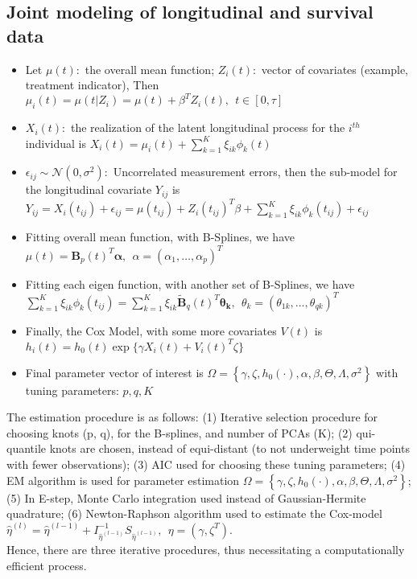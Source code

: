 \documentclass[11pt]{extarticle} %
\begin{document}
\subsection*{Joint modeling of longitudinal and survival data}
\begin{itemize}
\item Let $\mu(t):$ the overall mean function; $Z_i(t):$ vector of covariates (example, treatment indicator), Then 
$ \mu_i(t) = \mu(t|Z_i) = \mu(t) + \beta^T Z_i(t), \ \ t \in [0, \tau] $
\item $X_i(t):$ the realization of the latent longitudinal process for the $i^{th}$ individual is 
$ X_i (t) = \mu_i (t) + \sum_{k=1}^{K} \xi_{ik} \phi_k (t) $
\item $\epsilon _{ij} \sim  \mathcal{N}(0, \sigma^2): $ Uncorrelated measurement errors, then the sub-model for the longitudinal covariate $Y_{ij}$ is  
$ Y_{ij} =  X_i(t_{ij}) + \epsilon _{ij} = \mu(t_{ij}) + Z_i(t_{ij})^T\beta + \sum_{k=1}^{K} \xi_{ik} \phi_k (t_{ij})+ \epsilon_{ij}$
\item Fitting overall mean function, with B-Splines, we have 
$ \mu(t) =  \mathbf{B}_p(t)^T \mathbf{\alpha},\ \ \alpha = (\alpha_1, \dots, \alpha_p)^T $
\item Fitting each eigen function, with another set of B-Splines, we have
$ \sum_{k=1}^{K} \xi_{ik} \phi_k (t_{ij}) =  \sum_{k=1}^{K} \xi_{ik} \widetilde{\mathbf{B}}_q(t)^T \mathbf{\theta _k},\ \ \theta_{k} = (\theta_{1k}, \dots, \theta_{qk})^T $
\item Finally, the Cox Model, with some more covariates $V(t)$ is 
$ h_i(t) = h_0(t)\exp\{\gamma X_i(t) + V_i(t)^T \zeta \}$
\item Final parameter vector of interest is 
$ \Omega = \left\{ \gamma, \zeta, h_0(\cdot), \alpha, \beta, \Theta, \Lambda, \sigma^2 \right\} $
with tuning parameters: $p, q, K$
\end{itemize}
The estimation procedure is as follows: (1) Iterative selection procedure for choosing knots (p, q), for the B-splines, and number of PCAs (K); (2) qui-quantile knots are chosen, instead of equi-distant (to not underweight time points with fewer observations); (3) AIC used for choosing these tuning parameters; (4) EM algorithm is used for parameter estimation $ \Omega = \left\{ \gamma, \zeta, h_0(\cdot), \alpha, \beta, \Theta, \Lambda, \sigma^2 \right\} $; (5) In E-step, Monte Carlo integration used instead of Gaussian-Hermite quadrature; (6) Newton-Raphson algorithm used to estimate the Cox-model 
$ \hat{\eta}^{(l)} = \hat{\eta}^{(l-1)} + I^{-1}_{\hat{\eta}^{(l-1)}} S_{\hat{\eta}^{(l-1)}},\ \ \eta = (\gamma, \zeta^T)$. \\
Hence, there are three iterative procedures, thus necessitating a computationally efficient process. 
\end{document}
